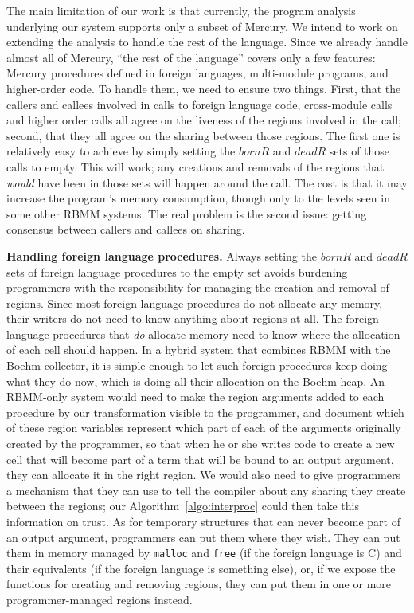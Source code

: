 \documentclass{tlp}
\def\bornRegs{\mathit{bornR}}
\def\deadRegs{\mathit{deadR}}
\newcommand{\code}[1]{{\tt#1}}
\begin{document}
The main limitation of our work is that currently,
the program analysis underlying our system supports only a subset of Mercury.
We intend to work on extending the analysis to handle the rest of the language.
Since we already handle almost all of Mercury,
``the rest of the language'' covers only a few features:
Mercury procedures defined in foreign languages,
multi-module programs, and higher-order code.
To handle them, we need to ensure two things.
First, that the callers and callees involved in
calls to foreign language code, cross-module calls and higher order calls
all agree on the liveness of the regions involved in the call;
second, that they all agree on the sharing between those regions.
The first one is relatively easy to achieve
by simply setting the $\bornRegs$ and $\deadRegs$ sets of those calls to empty.
This will work;
any creations and removals of the regions
that \emph{would} have been in those sets will happen around the call.
The cost is that it may increase the program's memory consumption,
though only to the levels seen in some other RBMM systems.
The real problem is the second issue:
getting consensus between callers and callees on sharing.

\noindent\textbf{Handling foreign language procedures.}
Always setting the $\bornRegs$ and $\deadRegs$ sets
of foreign language procedures to the empty set
avoids burdening programmers with the responsibility
for managing the creation and removal of regions.
Since most foreign language procedures do not allocate any memory,
their writers do not need to know anything about regions at all.
The foreign language procedures that \emph{do} allocate memory
need to know where the allocation of each cell should happen.
In a hybrid system that combines RBMM with the Boehm collector,
it is simple enough to let such foreign procedures
keep doing what they do now,
which is doing all their allocation on the Boehm heap.
An RBMM-only system would need to make
the region arguments added to each procedure by our transformation
visible to the programmer,
and document which of these region variables represent
which part of each of the arguments originally created by the programmer,
so that when he or she writes code to create a new cell
that will become part of a term that will be bound to an output argument,
they can allocate it in the right region.
We would also need to give programmers a mechanism
that they can use to tell the compiler about any sharing they create
between the regions;
our Algorithm~\ref{algo:interproc} could then take this information on trust.
As for temporary structures that can never become part of an output argument,
programmers can put them where they wish.
They can put them in memory managed
by \code{malloc} and \code{free} (if the foreign language is C)
and their equivalents (if the foreign language is something else),
or, if we expose the functions for creating and removing regions,
they can put them in one or more programmer-managed regions instead.
\end{document}
